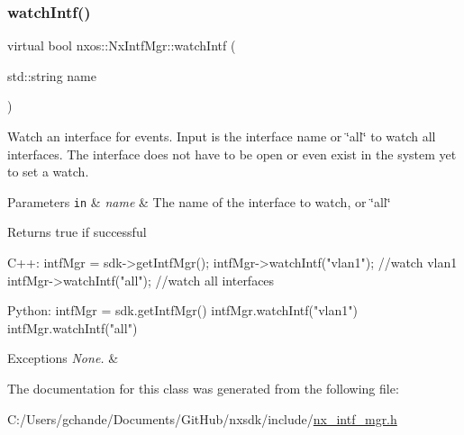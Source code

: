 \subsubsection{\texorpdfstring{watch\+Intf()}{watchIntf()}}
{\footnotesize\ttfamily virtual bool nxos\+::\+Nx\+Intf\+Mgr\+::watch\+Intf (\begin{DoxyParamCaption}\item[{std\+::string}]{name }\end{DoxyParamCaption})\hspace{0.3cm}{\ttfamily [pure virtual]}}

Watch an interface for events. Input is the interface name or \char`\"{}all\char`\"{} to watch all interfaces. The interface does not have to be open or even exist in the system yet to set a watch. 
\begin{DoxyParams}[1]{Parameters}
\mbox{\tt in}  & {\em name} & The name of the interface to watch, or \char`\"{}all\char`\"{} \\
\hline
\end{DoxyParams}
\begin{DoxyReturn}{Returns}
true if successful
\end{DoxyReturn}

\begin{DoxyCode}
C++:
      intfMgr = sdk->getIntfMgr();
      intfMgr->watchIntf(\textcolor{stringliteral}{"vlan1"});  \textcolor{comment}{//watch vlan1}
      intfMgr->watchIntf(\textcolor{stringliteral}{"all"});   \textcolor{comment}{//watch all interfaces}

Python:
      intfMgr = sdk.getIntfMgr()
      intfMgr.watchIntf(\textcolor{stringliteral}{"vlan1"}) 
      intfMgr.watchIntf(\textcolor{stringliteral}{"all"})
\end{DoxyCode}



\begin{DoxyExceptions}{Exceptions}
{\em None.} & \\
\hline
\end{DoxyExceptions}


The documentation for this class was generated from the following file\+:\begin{DoxyCompactItemize}
\item 
C\+:/\+Users/gchande/\+Documents/\+Git\+Hub/nxsdk/include/\mbox{\hyperlink{nx__intf__mgr_8h}{nx\+\_\+intf\+\_\+mgr.\+h}}\end{DoxyCompactItemize}
